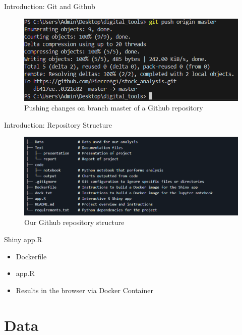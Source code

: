 \documentclass{beamer}
\begin{document}
\begin{frame}{Introduction: Git and Github}
    \begin{figure}
        \centering
        \includegraphics[width=0.9\linewidth]{gitpush.png}
        \caption{Pushing changes on branch master of a Github repository}
        \label{fig:enter-label}
    \end{figure}
\end{frame}


\begin{frame}{Introduction: Repository Structure}
\begin{figure}
    \centering
    \includegraphics[width=0.9\linewidth]{repo_structure.png}
    \caption{Our Github repository structure}
    \label{fig:enter-label}
\end{figure}
    
\end{frame}


\begin{frame}{Shiny app.R}
\begin{itemize}
    \item Dockerfile
    \item app.R
    \item Results in the browser via Docker Container
\end{itemize}
    
\end{frame}


\section{Data}
\end{document}
